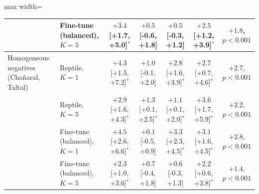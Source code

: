 \begin{table}[ht]
\begin{adjustbox}{max width=\textwidth}
\begin{tabular}{llccccc}
         & Fine-tune (balanced), $K=5$ & $+3.4$ [+1.7, +5.0]$^{*}$ & $+0.5$ [-0.6, +1.8] & $+0.5$ [-0.3, +1.2] & $+2.5$ [+1.2, +3.9]$^{*}$ & $+1.8$, $p<0.001$ \\
        \midrule
        Homogeneous negatives (Cha\~naral, Taltal) & Reptile, $K=1$ & $+4.3$ [+1.5, +7.2]$^{*}$ & $+1.0$ [-0.1, +2.0] & $+2.8$ [+1.6, +3.9]$^{*}$ & $+2.7$ [+0.7, +4.6]$^{*}$ & $+2.7$, $p<0.001$ \\
         & Reptile, $K=5$ & $+2.9$ [+1.6, +4.3]$^{*}$ & $+1.3$ [+0.1, +2.5]$^{*}$ & $+1.1$ [+0.1, +2.0]$^{*}$ & $+3.6$ [+1.7, +5.9]$^{*}$ & $+2.2$, $p<0.001$ \\
         & Fine-tune (balanced), $K=1$ & $+4.5$ [+2.6, +6.6]$^{*}$ & $+0.1$ [-0.5, +0.9] & $+3.3$ [+2.3, +4.5]$^{*}$ & $+3.1$ [+1.6, +4.5]$^{*}$ & $+2.8$, $p<0.001$ \\
         & Fine-tune (balanced), $K=5$ & $+2.3$ [+1.0, +3.6]$^{*}$ & $+0.7$ [-0.4, +1.8] & $+0.6$ [-0.3, +1.3] & $+2.2$ [+0.6, +3.8]$^{*}$ & $+1.4$, $p<0.001$ \\
        \bottomrule
    \end{tabular}
    \end{adjustbox}
\end{table}
